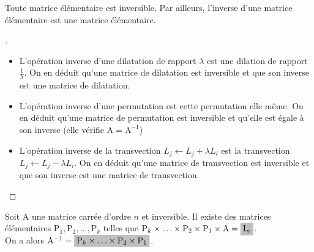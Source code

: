 \documentclass[12pt]{article}
\newcommand{\hideM}[1]{\mbox{\vphantom{$#1$}\smash{\colorbox{gray!50}{$\displaystyle #1$}}} }
\theoremstyle{break}
\newenvironment{demo}[1][\proofname]{%
  \begin{proof}[#1]$ $\newline
}{%
  \end{proof}
}
\begin{document}
\begin{proposition}{}{}
Toute matrice élémentaire est inversible. Par ailleurs, l'inverse d'une matrice élémentaire est une matrice élémentaire.
\end{proposition}

\begin{demo}
\begin{itemize}[noitemsep,topsep=0pt]
  \item L'opération inverse d'une dilatation de rapport $\lambda$ est une dilation de rapport $\frac{1}{\lambda}$. On en déduit qu'une matrice de dilatation est inversible et que son inverse est une matrice de dilatation.
  \item L'opération inverse d'une permutation est cette permutation elle même. On en déduit qu'une matrice de permutation est inversible et qu'elle est égale à son inverse (elle vérifie $\mathrm{A}=\mathrm{A}^{-1}$)
  \item L'opération inverse de la transvection $L_{j} \leftarrow L_{j}+\lambda L_{i}$ est la transvection $L_{j} \leftarrow L_{j}-\lambda L_{i}$. On en déduit qu'une matrice de transvection est inversible et que son inverse est une matrice de transvection.
\end{itemize}
\end{demo}

\begin{proposition}{}{}
Soit A une matrice carrée d'ordre $n$ et inversible. Il existe des matrices élémentaires $\mathrm{P}_{1}, \mathrm{P}_{2}, \ldots, \mathrm{P}_{k}$ telles que $\mathrm{P}_{k} \times \ldots \times \mathrm{P}_{2} \times \mathrm{P}_{1} \times \mathrm{A}=\hideM{\mathrm{I}_{n}}$.\\
On a alors $\mathrm{A}^{-1}=\hideM{\mathrm{P}_{k} \times \ldots \times \mathrm{P}_{2} \times \mathrm{P}_{1}}$.
\end{proposition}
\end{document}
